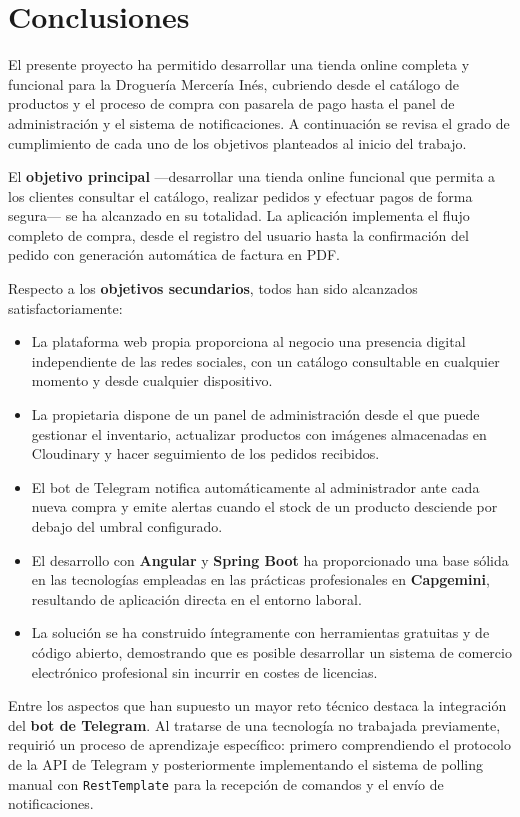 \section{Conclusiones}

El presente proyecto ha permitido desarrollar una tienda online completa y funcional para la Droguería Mercería Inés, cubriendo desde el catálogo de productos y el proceso de compra con pasarela de pago hasta el panel de administración y el sistema de notificaciones. A continuación se revisa el grado de cumplimiento de cada uno de los objetivos planteados al inicio del trabajo.

El \textbf{objetivo principal} —desarrollar una tienda online funcional que permita a los clientes consultar el catálogo, realizar pedidos y efectuar pagos de forma segura— se ha alcanzado en su totalidad. La aplicación implementa el flujo completo de compra, desde el registro del usuario hasta la confirmación del pedido con generación automática de factura en PDF.

Respecto a los \textbf{objetivos secundarios}, todos han sido alcanzados satisfactoriamente:

\begin{itemize}
    \item La plataforma web propia proporciona al negocio una presencia digital independiente de las redes sociales, con un catálogo consultable en cualquier momento y desde cualquier dispositivo.
    \item La propietaria dispone de un panel de administración desde el que puede gestionar el inventario, actualizar productos con imágenes almacenadas en Cloudinary y hacer seguimiento de los pedidos recibidos.
    \item El bot de Telegram notifica automáticamente al administrador ante cada nueva compra y emite alertas cuando el stock de un producto desciende por debajo del umbral configurado.
    \item El desarrollo con \textbf{Angular} y \textbf{Spring Boot} ha proporcionado una base sólida en las tecnologías empleadas en las prácticas profesionales en \textbf{Capgemini}, resultando de aplicación directa en el entorno laboral.
    \item La solución se ha construido íntegramente con herramientas gratuitas y de código abierto, demostrando que es posible desarrollar un sistema de comercio electrónico profesional sin incurrir en costes de licencias.
\end{itemize}

Entre los aspectos que han supuesto un mayor reto técnico destaca la integración del \textbf{bot de Telegram}. Al tratarse de una tecnología no trabajada previamente, requirió un proceso de aprendizaje específico: primero comprendiendo el protocolo de la API de Telegram y posteriormente implementando el sistema de polling manual con \texttt{RestTemplate} para la recepción de comandos y el envío de notificaciones.

